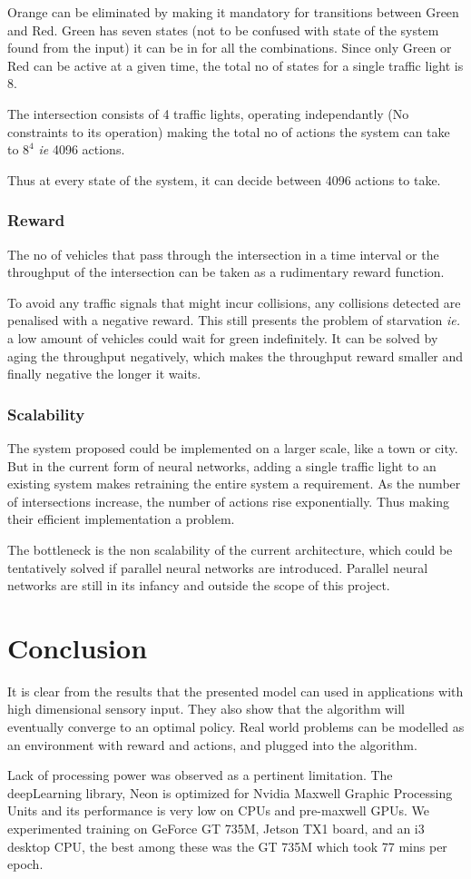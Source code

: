 \documentclass[a4paper,11pt]{report}
\begin{document}
				Orange can be eliminated by making it mandatory for transitions between Green and Red. Green has seven states (not to be confused with state of the system found from the input) it can be in for all the combinations. Since only Green or Red can be active at a given time, the total no of states for a single traffic light is 8.

				The intersection consists of 4 traffic lights, operating independantly (No constraints to its operation) making the total no of actions the system can take to $8^4$ \emph{ie} 4096 actions.

				Thus at every state of the system, it can decide between 4096 actions to take.
			\subsection{Reward}
				The no of vehicles that pass through the intersection in a time interval or the throughput of the intersection can be taken as a rudimentary reward function.

				To avoid any traffic signals that might incur collisions, any collisions detected are penalised with a negative reward. This still presents the problem of starvation \emph{ie.} a low amount of vehicles could wait for green indefinitely. It can be solved by aging the throughput negatively, which makes the throughput reward smaller and finally negative the longer it waits.
			\subsection{Scalability}
				The system proposed could be implemented on a larger scale, like a town or city. But in the current form of neural networks, adding a single traffic light to an existing system makes retraining the entire system a requirement. As the number of intersections increase, the number of actions rise exponentially. Thus making their efficient implementation a problem.

				The bottleneck is the non scalability of the current architecture, which could be tentatively solved if parallel neural networks are introduced. Parallel neural networks are still in its infancy and outside the scope of this project.
	\newpage
	\chapter{Conclusion}
		It is clear from the results that the presented model can used in applications with high dimensional sensory input. They also show that the algorithm will eventually converge to an optimal policy. Real world problems can be modelled as an environment with reward and actions, and plugged into the algorithm.

		Lack of processing power was observed as a pertinent limitation. The deepLearning library, Neon is optimized for Nvidia Maxwell Graphic Processing Units and its performance is very low on CPUs and pre-maxwell GPUs. We experimented training on GeForce GT 735M, Jetson TX1 board, and an i3 desktop CPU, the best among these was the GT 735M which took 77 mins per epoch.


	\newpage
	\nocite{*}
	
	
\end{document}
